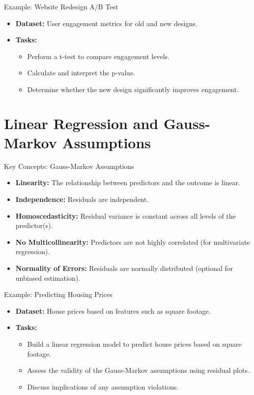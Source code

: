 \documentclass{beamer}
\begin{document}
\begin{frame}{Example: Website Redesign A/B Test}
\begin{itemize}
    \item \textbf{Dataset:} User engagement metrics for old and new designs.
    \item \textbf{Tasks:}
    \begin{itemize}
        \item Perform a t-test to compare engagement levels.
        \item Calculate and interpret the p-value.
        \item Determine whether the new design significantly improves engagement.
    \end{itemize}
\end{itemize}
\end{frame}

\section{Linear Regression and Gauss-Markov Assumptions}

\begin{frame}{Key Concepts: Gauss-Markov Assumptions}
\begin{itemize}
    \item \textbf{Linearity:} The relationship between predictors and the outcome is linear.
    \item \textbf{Independence:} Residuals are independent.
    \item \textbf{Homoscedasticity:} Residual variance is constant across all levels of the predictor(s).
    \item \textbf{No Multicollinearity:} Predictors are not highly correlated (for multivariate regression).
    \item \textbf{Normality of Errors:} Residuals are normally distributed (optional for unbiased estimation).
\end{itemize}
\end{frame}

\begin{frame}{Example: Predicting Housing Prices}
\begin{itemize}
    \item \textbf{Dataset:} House prices based on features such as square footage.
    \item \textbf{Tasks:}
    \begin{itemize}
        \item Build a linear regression model to predict house prices based on square footage.
        \item Assess the validity of the Gauss-Markov assumptions using residual plots.
        \item Discuss implications of any assumption violations.
    \end{itemize}
\end{itemize}
\end{frame}
\end{document}

